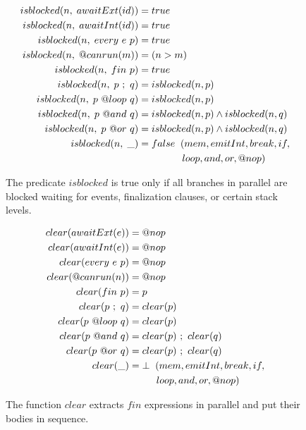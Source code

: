 \begin{figure}
{\small
\begin{align*}
  isblocked(n, \1 awaitExt(id)) &= true                                   \\
  isblocked(n, \1 awaitInt(id)) &= true                                   \\
  isblocked(n, \1 every~e~p)    &= true                                   \\
  isblocked(n, \1 @canrun(m))   &= (n > m)                                \\
  isblocked(n, \1 fin~p)        &= true                                   \\
  isblocked(n, \1 p~;~q)        &= isblocked(n,p)                         \\
  isblocked(n, \1 p~@loop~q)    &= isblocked(n,p)                         \\
  isblocked(n, \1 p~@and~q)     &= isblocked(n,p) \wedge isblocked(n,q)   \\
  isblocked(n, \1 p~@or~q)      &= isblocked(n,p) \wedge isblocked(n,q)   \\
  isblocked(n, \1 \_)           &= false \2 (mem,emitInt,break,if,        \\
                                & \5\5\5\1 loop,and,or,@nop)   %
\end{align*}
}
\caption{
The predicate $isblocked$ is true only if all branches in parallel are blocked
waiting for events, finalization clauses, or certain stack levels.
\label{fig.isblocked}
}
\end{figure}

\begin{figure}[b]
{\small
\begin{align*}
  clear( awaitExt(e) ) &= @nop                  \\
  clear( awaitInt(e) ) &= @nop                  \\
  clear( every~e~p )   &= @nop                  \\
  clear( @canrun(n) )  &= @nop                  \\
  clear( fin~p )       &= p                     \\
  clear( p~;~q )       &= clear(p)              \\
  clear( p~@loop~q )   &= clear(p)              \\
  clear( p~@and~q )    &= clear(p)~;~clear(q)   \\
  clear( p~@or~q )     &= clear(p)~;~clear(q)   \\
  clear( \_ )          &= \bot \2 (mem,emitInt,break,if, \\
                                  & \5\5 loop,and,or,@nop) %
\end{align*}
}
\caption{
The function $clear$ extracts $fin$ expressions in parallel and put their 
bodies in sequence.
\label{fig.formal.clear}
}
\end{figure}

